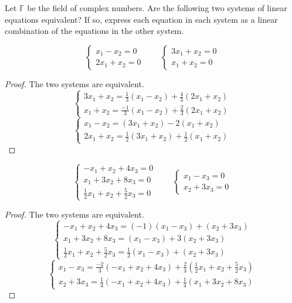 Let $\mathbb{F}$ be the field of complex numbers. Are the following two systems of linear equations equivalent? If so, express each equation in each system as a linear combination of the equations in the other system.

\begin{exercise}
	\[
		\begin{cases}
			x_{1} - x_{2} = 0 \\
			2x_{1} + x_{2} = 0
		\end{cases}
		\qquad
		\begin{cases}
			3x_{1} + x_{2} = 0 \\
			x_{1} + x_{2} = 0
		\end{cases}
	\]
\end{exercise}

\begin{proof}
	The two systems are equivalent.
	\[
		\begin{cases}
			3x_{1} + x_{2} = \frac{1}{3}(x_{1} - x_{2}) + \frac{4}{3}(2x_{1} + x_{2}) \\
			x_{1} + x_{2} =  \frac{-1}{3}(x_{1} - x_{2}) + \frac{2}{3}(2x_{1} + x_{2})
		\end{cases}
	\]
	\[
		\begin{cases}
			x_{1} - x_{2} = (3x_{1} + x_{2}) - 2(x_{1} + x_{2}) \\
			2x_{1} + x_{2} = \frac{1}{2}(3x_{1} + x_{2}) + \frac{1}{2}(x_{1} + x_{2})
		\end{cases}
	\]
\end{proof}

\begin{exercise}
	\[
		\begin{cases}
			-x_{1} + x_{2} + 4x_{3} = 0 \\
			x_{1} + 3x_{2} + 8x_{3} = 0 \\
			\frac{1}{2}x_{1} + x_{2} + \frac{5}{2}x_{3} = 0
		\end{cases}
		\qquad
		\begin{cases}
			x_{1} - x_{3} = 0 \\
			x_{2} + 3x_{3} = 0
		\end{cases}
	\]
\end{exercise}

\begin{proof}
	The two systems are equivalent.
	\[
		\begin{cases}
			-x_{1} + x_{2} + 4x_{3} = (-1)(x_{1} - x_{3}) + (x_{2} + 3x_{3}) \\
			x_{1} + 3x_{2} + 8x_{3} = (x_{1} - x_{3}) + 3(x_{2} + 3x_{3})    \\
			\frac{1}{2}x_{1} + x_{2} + \frac{5}{2}x_{3} = \frac{1}{2}(x_{1} - x_{3}) + (x_{2} + 3x_{3})
		\end{cases}
	\]
	\[
		\begin{cases}
			x_{1} - x_{3} = \frac{-2}{3}(-x_{1} + x_{2} + 4x_{3}) + \frac{2}{3}(\frac{1}{2}x_{1} + x_{2} + \frac{5}{2}x_{3}) \\
			x_{2} + 3x_{3} = \frac{1}{4}(-x_{1} + x_{2} + 4x_{3}) + \frac{1}{4}(x_{1} + 3x_{2} + 8x_{3})
		\end{cases}
	\]
\end{proof}

